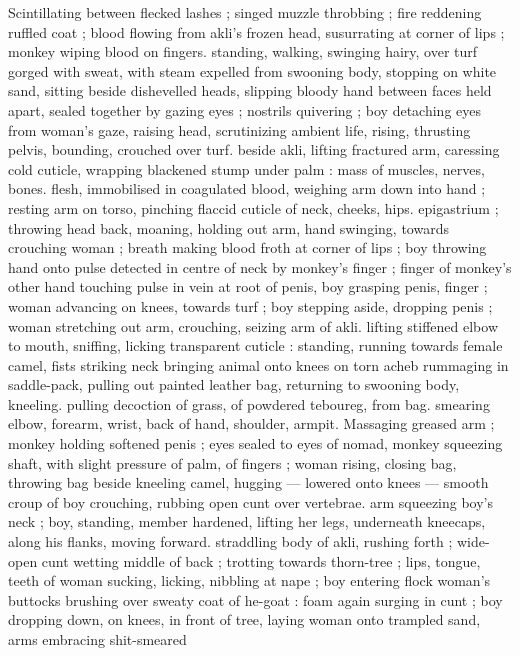 Scintillating between flecked lashes ; singed muzzle throbbing ; fire 
reddening ruffled coat ; blood flowing from akli's frozen head, 
susurrating at corner of lips ; monkey wiping blood on fingers. 
standing, walking, swinging hairy, over turf gorged with sweat, with 
steam expelled from swooning body, stopping on white sand, sitting 
beside dishevelled heads, slipping bloody hand between faces held 
apart, sealed together by gazing eyes ; nostrils quivering ; boy 
detaching eyes from woman's gaze, raising head, scrutinizing 
ambient life, rising, thrusting pelvis, bounding, crouched over turf. 
beside akli, lifting fractured arm, caressing cold cuticle, wrapping 
blackened stump under palm : mass of muscles, nerves, bones. 
flesh, immobilised in coagulated blood, weighing arm down into hand 
; resting arm on torso, pinching flaccid cuticle of neck, cheeks, hips. 
epigastrium ; throwing head back, moaning, holding out arm, hand 
swinging, towards crouching woman ; breath making blood froth at 
corner of lips ; boy throwing hand onto pulse detected in centre of 
neck by monkey's finger ; finger of monkey's other hand touching 
pulse in vein at root of penis, boy grasping penis, finger ; woman 
advancing on knees, towards turf ; boy stepping aside, dropping 
penis ; woman stretching out arm, crouching, seizing arm of akli. 
lifting stiffened elbow to mouth, sniffing, licking transparent cuticle : 
standing, running towards female camel, fists striking neck bringing 
animal onto knees on torn acheb rummaging in saddle-pack, pulling 
out painted leather bag, returning to swooning body, kneeling. 
pulling decoction of grass, of powdered teboureg, from bag. 
smearing elbow, forearm, wrist, back of hand, shoulder, armpit. 
Massaging greased arm ; monkey holding softened penis ; eyes 
sealed to eyes of nomad, monkey squeezing shaft, with slight 
pressure of palm, of fingers ; woman rising, closing bag, throwing 
bag beside kneeling camel, hugging --- lowered onto knees --- 
smooth croup of boy crouching, rubbing open cunt over vertebrae. 
arm squeezing boy's neck ; boy, standing, member hardened, lifting 
her legs, underneath kneecaps, along his flanks, moving forward. 
straddling body of akli, rushing forth ; wide-open cunt wetting 
middle of back ; trotting towards thorn-tree ; lips, tongue, teeth of 
woman sucking, licking, nibbling at nape ; boy entering flock {\gl} 
woman's buttocks brushing over sweaty coat of he-goat : foam again 
surging in cunt ; boy dropping down, on knees, in front of tree, 
laying woman onto trampled sand, arms embracing shit-smeared 
